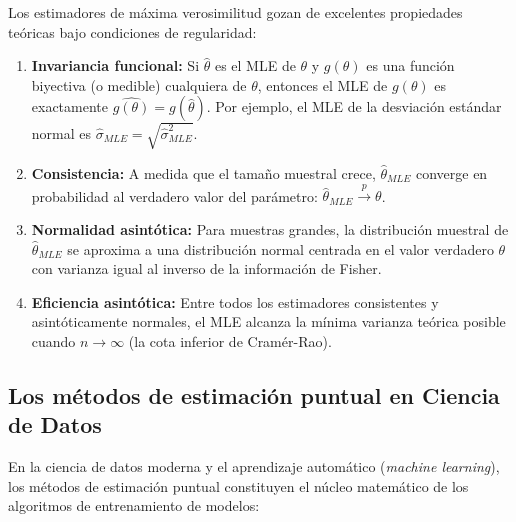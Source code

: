 \begin{propiedad}
	Los estimadores de máxima verosimilitud gozan de excelentes propiedades teóricas bajo condiciones de regularidad:
	\begin{enumerate}
		\item \textbf{Invariancia funcional:} Si $\hat{\theta}$ es el MLE de $\theta$ y $g(\theta)$ es una función biyectiva (o medible) cualquiera de $\theta$, entonces el MLE de $g(\theta)$ es exactamente $\widehat{g(\theta)} = g(\hat{\theta})$. Por ejemplo, el MLE de la desviación estándar normal es $\hat{\sigma}_{MLE} = \sqrt{\hat{\sigma}^2_{MLE}}$.
		\item \textbf{Consistencia:} A medida que el tamaño muestral crece, $\hat{\theta}_{MLE}$ converge en probabilidad al verdadero valor del parámetro: $\hat{\theta}_{MLE} \xrightarrow{p} \theta$.
		\item \textbf{Normalidad asintótica:} Para muestras grandes, la distribución muestral de $\hat{\theta}_{MLE}$ se aproxima a una distribución normal centrada en el valor verdadero $\theta$ con varianza igual al inverso de la información de Fisher.
		\item \textbf{Eficiencia asintótica:} Entre todos los estimadores consistentes y asintóticamente normales, el MLE alcanza la mínima varianza teórica posible cuando $n \to \infty$ (la cota inferior de Cramér-Rao).
	\end{enumerate}
\end{propiedad}

\subsection{Los métodos de estimación puntual en Ciencia de Datos}

En la ciencia de datos moderna y el aprendizaje automático (\emph{machine learning}), los métodos de estimación puntual constituyen el núcleo matemático de los algoritmos de entrenamiento de modelos:

